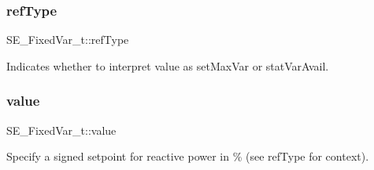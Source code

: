 \subsubsection{\texorpdfstring{ref\+Type}{refType}}
{\footnotesize\ttfamily S\+E\+\_\+\+Fixed\+Var\+\_\+t\+::ref\+Type}

Indicates whether to interpret \textquotesingle{}value\textquotesingle{} as set\+Max\+Var or stat\+Var\+Avail. \mbox{\label{group__FixedVar_gae431366e46ceeb682588ee1bcfcc9de9}} 
\subsubsection{\texorpdfstring{value}{value}}
{\footnotesize\ttfamily S\+E\+\_\+\+Fixed\+Var\+\_\+t\+::value}

Specify a signed setpoint for reactive power in \% (see \textquotesingle{}ref\+Type\textquotesingle{} for context). 